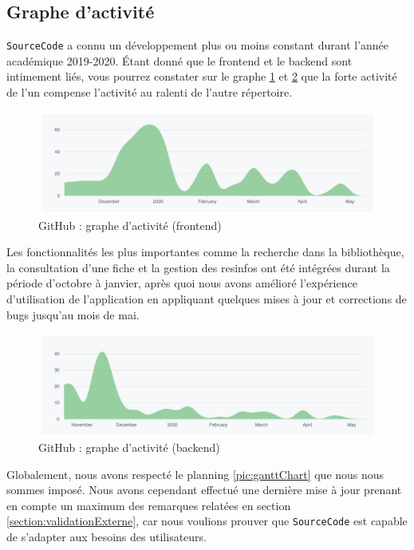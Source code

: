 \subsection{Graphe d'activité}

\texttt{SourceCode} a connu un développement plus ou moins constant durant l'année académique 2019-2020. Étant donné que le \gls{frontend} et le \gls{backend} sont intimement liés, vous pourrez constater sur le graphe \ref{figure:frontendActivity} et \ref{figure:backendActivity} que la forte activité de l'un compense l'activité au ralenti de l'autre répertoire.

\begin{figure}[H]
    \includegraphics[width=\textwidth,height=0.3\textheight,keepaspectratio]{images/analyseCritique/graph_frontend.png}
    \centering
    \caption{GitHub : graphe d'activité (frontend)}
    \label{figure:frontendActivity}
\end{figure}

Les fonctionnalités les plus importantes comme la recherche dans la bibliothèque, la consultation d'une \gls{fiche} et la gestion des \glspl{resinfo} ont été intégrées durant la période d'octobre à janvier, après quoi nous avons amélioré l'expérience d'utilisation de l'application en appliquant quelques mises à jour et corrections de bugs jusqu'au mois de mai.\\

\begin{figure}[H]
    \includegraphics[width=\textwidth,height=0.3\textheight,keepaspectratio]{images/analyseCritique/graph_backend.png}
    \centering
    \caption{GitHub : graphe d'activité (backend)}
    \label{figure:backendActivity}
\end{figure}


Globalement, nous avons respecté le planning \ref{pic:ganttChart} que nous nous sommes imposé. Nous avons cependant effectué une dernière mise à jour prenant en compte un maximum des remarques relatées en section \ref{section:validationExterne}, car nous voulions prouver que \texttt{SourceCode} est capable de s'adapter aux besoins des utilisateurs.
